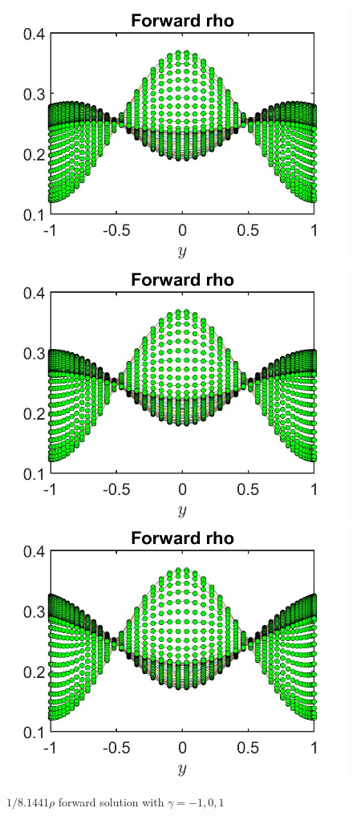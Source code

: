 \documentclass[11pt, a4paper]{article}
\theoremstyle{definition}
\begin{document}
    \begin{figure}[h]
		\includegraphics[scale=0.25]{gamma1.jpg}
		\includegraphics[scale=0.25]{gamma0.jpg}
		\includegraphics[scale=0.25]{gamma11.jpg}
		\caption{$1/8.1441\rho$ forward solution with $\gamma = -1,0,1$ }
		\label{gamma1}
	\end{figure}
\end{document}
